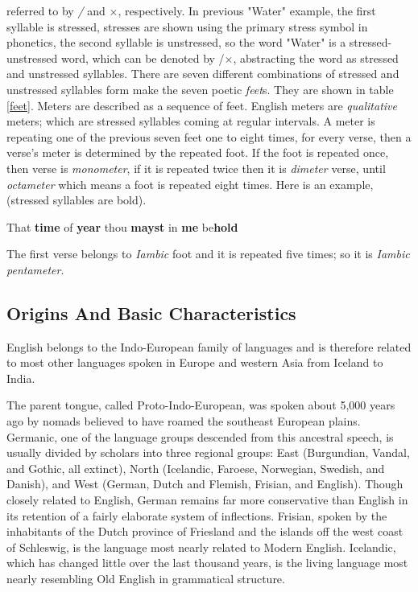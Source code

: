 \documentclass[12pt]{report}
\begin{document}
referred to by \textit{/} and $\times$, respectively. In previous "Water" example, the
first syllable is stressed, stresses are shown using the primary stress symbol
 in phonetics, the second syllable is unstressed, so
the word "Water" is a  stressed-unstressed word, which can be denoted by
/$\times$, abstracting the word as stressed and unstressed syllables.
There are seven different combinations of stressed and unstressed syllables form
make the seven poetic \textit{feet}s.  They are shown in table \ref{feet}.
Meters are described as a sequence of feet. English meters are \textit{qualitative}
meters; which are stressed syllables coming at regular intervals.
A meter is repeating one of the previous seven feet one to eight times,
for every verse, then a verse's meter is determined by the repeated foot.
If the foot is repeated once, then verse is \textit{monometer}, if it is
repeated twice  then it is \textit{dimeter} verse, until \textit{octameter} which means
a foot is repeated eight times.  Here is an example, (stressed syllables are bold).
\begin{center}
 That \textbf{time} of \textbf{year} thou \textbf{mayst}  in \textbf{me}
be\textbf{hold}
\end{center}
The first verse belongs to \textit{Iambic} foot and it is repeated five times; so
it is \textit{Iambic pentameter}.




\subsection*{Origins And Basic Characteristics}
English belongs to the Indo-European family of languages and is therefore related
to most other languages spoken in Europe and western Asia from Iceland to India.

The parent tongue, called Proto-Indo-European, was spoken about 5,000 years ago
by nomads believed to have roamed the southeast European plains. Germanic, one of
the language groups descended from this ancestral speech, is usually divided by
scholars into three regional groups: East (Burgundian, Vandal, and Gothic, all
extinct), North (Icelandic, Faroese, Norwegian, Swedish, and Danish), and West
(German, Dutch and Flemish, Frisian, and English). Though closely related to
English, German remains far more conservative than English in its retention of a
fairly elaborate system of inflections. Frisian, spoken by the inhabitants of the
Dutch province of Friesland and the islands off the west coast of Schleswig, is
the language most nearly related to Modern English. Icelandic, which has changed
little over the last thousand years, is the living language most nearly
resembling Old English in grammatical structure.
\end{document}
